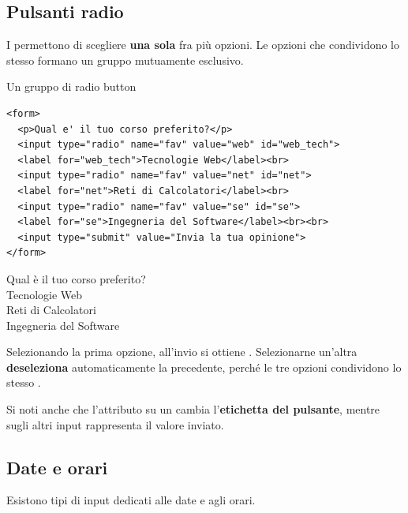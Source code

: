 \subsection{Pulsanti radio}

I  permettono di scegliere \textbf{una sola} fra più opzioni.
Le opzioni che condividono lo stesso  formano un gruppo mutuamente
esclusivo.

\begin{esempio}{Un gruppo di radio button}
\begin{affianco}[0.58]
\codicepiccolo
\begin{lstlisting}[style=html, name=radio.html]
<form>
  <p>Qual e' il tuo corso preferito?</p>
  <input type="radio" name="fav" value="web" id="web_tech">
  <label for="web_tech">Tecnologie Web</label><br>
  <input type="radio" name="fav" value="net" id="net">
  <label for="net">Reti di Calcolatori</label><br>
  <input type="radio" name="fav" value="se" id="se">
  <label for="se">Ingegneria del Software</label><br><br>
  <input type="submit" value="Invia la tua opinione">
</form>
\end{lstlisting}
\risultato
\begin{browser}
  Qual è il tuo corso preferito?\\[2pt]
   Tecnologie Web\\
   Reti di Calcolatori\\
   Ingegneria del Software\\[4pt]
\end{browser}
\end{affianco}

Selezionando la prima opzione, all'invio si ottiene . Selezionarne
un'altra \textbf{deseleziona} automaticamente la precedente, perché le tre
opzioni condividono lo stesso .

Si noti anche che l'attributo  su un 
cambia l'\textbf{etichetta del pulsante}, mentre sugli altri input rappresenta il
valore inviato.
\end{esempio}

\subsection{Date e orari}

Esistono tipi di input dedicati alle date e agli orari.

